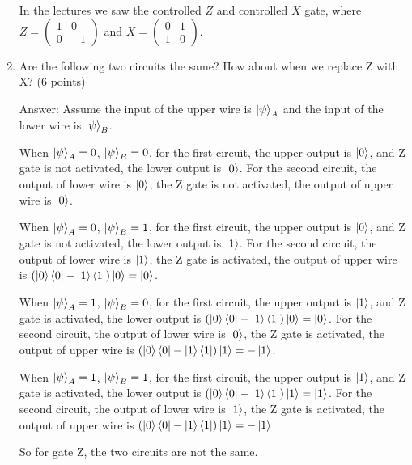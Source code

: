 \documentclass{article}
\begin{document}
\begin{enumerate}
          In the lectures we saw the controlled $Z$ and controlled $X$ gate, where $Z = \begin{pmatrix} 1 & 0 \\ 0 & -1 \end{pmatrix}$ and $X = \begin{pmatrix} 0 & 1 \\ 1 & 0 \end{pmatrix}$.
    \item Are the following two circuits the same? How about when we replace Z with X? (6 points)


          Answer:
          Assume the input of the upper wire is $\ket{\psi}_A$ and the input of the lower wire is $\ket{\psi}_B$.

          When $\ket{\psi}_A=0$, $\ket{\psi}_B=0$, for the first circuit, the upper output is $\ket{0}$, and Z gate is not activated, the lower output is $\ket{0}$. For the second circuit, the output of lower wire is $\ket{0}$, the Z gate is not activated, the output of upper wire is $\ket{0}$.

          When $\ket{\psi}_A=0$, $\ket{\psi}_B=1$, for the first circuit, the upper output is $\ket{0}$, and Z gate is not activated, the lower output is $\ket{1}$. For the second circuit, the output of lower wire is $\ket{1}$, the Z gate is activated, the output of upper wire is $(\ket{0}\bra{0}-\ket{1}\bra{1})\ket{0}=\ket{0}$.

          When $\ket{\psi}_A=1$, $\ket{\psi}_B=0$, for the first circuit, the upper output is $\ket{1}$, and Z gate is activated, the lower output is $(\ket{0}\bra{0}-\ket{1}\bra{1})\ket{0}=\ket{0}$. For the second circuit, the output of lower wire is $\ket{0}$, the Z gate is activated, the output of upper wire is $(\ket{0}\bra{0}-\ket{1}\bra{1})\ket{1}=-\ket{1}$.

          When $\ket{\psi}_A=1$, $\ket{\psi}_B=1$, for the first circuit, the upper output is $\ket{1}$, and Z gate is activated, the lower output is $(\ket{0}\bra{0}-\ket{1}\bra{1})\ket{1}=\ket{1}$. For the second circuit, the output of lower wire is $\ket{1}$, the Z gate is activated, the output of upper wire is $(\ket{0}\bra{0}-\ket{1}\bra{1})\ket{1}=-\ket{1}$.

          So for gate Z, the two circuits are not the same.


\end{enumerate}
\end{document}
